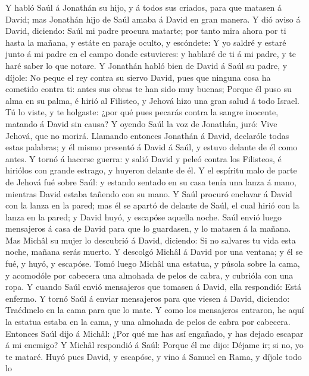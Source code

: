  Y habló Saúl á Jonathán su hijo, y á todos sus criados,
para que matasen á David; mas Jonathán hijo de Saúl amaba á David en
gran manera.  Y dió aviso á David, diciendo: Saúl mi padre
procura matarte; por tanto mira ahora por ti hasta la mañana, y estáte
en paraje oculto, y escóndete:  Y yo saldré y estaré junto á
mi padre en el campo donde estuvieres: y hablaré de ti á mi padre, y te
haré saber lo que notare.  Y Jonathán habló bien de David á
Saúl su padre, y díjole: No peque el rey contra su siervo David, pues
que ninguna cosa ha cometido contra ti: antes sus obras te han sido muy
buenas;  Porque él puso su alma en su palma, é hirió al
Filisteo, y Jehová hizo una gran salud á todo Israel. Tú lo viste, y te
holgaste: ¿por qué pues pecarás contra la sangre inocente, matando á
David sin causa?  Y oyendo Saúl la voz de Jonathán, juró:
Vive Jehová, que no morirá.  Llamando entonces Jonathán á
David, declaróle todas estas palabras; y él mismo presentó á David á
Saúl, y estuvo delante de él como antes.  Y tornó á hacerse
guerra: y salió David y peleó contra los Filisteos, é hiriólos con
grande estrago, y huyeron delante de él.  Y el espíritu malo
de parte de Jehová fué sobre Saúl: y estando sentado en su casa tenía
una lanza á mano, mientras David estaba tañendo con su mano.
 Y Saúl procuró enclavar á David con la lanza en la pared;
mas él se apartó de delante de Saúl, el cual hirió con la lanza en la
pared; y David huyó, y escapóse aquella noche.  Saúl envió
luego mensajeros á casa de David para que lo guardasen, y lo matasen á
la mañana. Mas Michâl su mujer lo descubrió á David, diciendo: Si no
salvares tu vida esta noche, mañana serás muerto.  Y
descolgó Michâl á David por una ventana; y él se fué, y huyó, y
escapóse.  Tomó luego Michâl una estatua, y púsola sobre la
cama, y acomodóle por cabecera una almohada de pelos de cabra, y
cubrióla con una ropa.  Y cuando Saúl envió mensajeros que
tomasen á David, ella respondió: Está enfermo.  Y tornó
Saúl á enviar mensajeros para que viesen á David, diciendo: Traédmelo en
la cama para que lo mate.  Y como los mensajeros entraron,
he aquí la estatua estaba en la cama, y una almohada de pelos de cabra
por cabecera.  Entonces Saúl dijo á Michâl: ¿Por qué me has
así engañado, y has dejado escapar á mi enemigo? Y Michâl respondió á
Saúl: Porque él me dijo: Déjame ir; si no, yo te mataré. 
Huyó pues David, y escapóse, y vino á Samuel en Rama, y díjole todo lo
